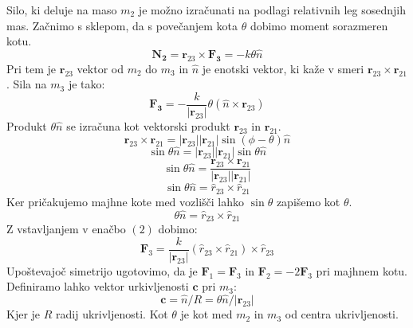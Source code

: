 \documentclass[10pt,a4paper]{article}
\begin{document}
Silo, ki deluje na maso $m_2$ je možno izračunati na podlagi relativnih leg sosednjih mas. Začnimo s sklepom, da s povečanjem kota $\theta$ dobimo moment sorazmeren kotu.
\begin{equation}
\mathbf{N_2} = \mathbf{r}_{23} \times \mathbf{F_3} = -k \theta \hat{n}
\end{equation}
Pri tem je $\mathbf{r}_{23}$ vektor od $m_2$ do $m_3$ in $\hat{n}$ je enotski vektor, ki kaže v smeri $\mathbf{r}_{23} \times \mathbf{r}_{21}$. Sila na $m_3$ je tako:
\begin{equation}
\mathbf{F_3} = -\frac{k}{|\mathbf{r}_{23}|}\theta(\hat{n} \times \mathbf{r}_{23})
\end{equation}
Produkt $\theta \hat{n}$ se izračuna kot vektorski produkt $\mathbf{r}_{23}$ in $\mathbf{r}_{21}$.
\begin{equation}
\mathbf{r}_{23} \times \mathbf{r}_{21} = |\mathbf{r}_{23}||\mathbf{r}_{21}| \sin(\phi - \theta) \hat{n}
\end{equation}
\begin{equation}
\sin\theta\hat{n} = |\mathbf{r}_{23}||\mathbf{r}_{21}|\sin\theta\hat{n}
\end{equation}
\begin{equation}
\sin\theta\hat{n} = \frac{\mathbf{r}_{23} \times \mathbf{r}_{21}}{|\mathbf{r}_{23}||\mathbf{r}_{21}|}
\end{equation}
\begin{equation} \label{eq:1}
\sin\theta\hat{n} = \hat{r}_{23} \times \hat{r}_{21}
\end{equation}
Ker pričakujemo majhne kote med vozlišči lahko $\sin\theta$ zapišemo kot $\theta$.
\begin{equation} \label{eq:2}
\theta\hat{n} = \hat{r}_{23} \times \hat{r}_{21}
\end{equation}
Z vstavljanjem v enačbo $(2)$ dobimo:
\begin{equation}
\mathbf{F}_3 = \frac{k}{|\mathbf{r}_{23}|}(\hat{r}_{23} \times \hat{r}_{21}) \times \hat{r}_{23}
\end{equation}
Upoštevajoč simetrijo ugotovimo, da je $\mathbf{F}_1 = \mathbf{F}_3$ in $\mathbf{F}_2 = -2\mathbf{F}_3$ pri majhnem kotu. Definiramo lahko vektor urkivljenosti $\mathbf{c}$ pri $m_3$:
\begin{equation}
\mathbf{c} = \hat{n}/R = \theta \hat{n} / |\mathbf{r}_{23}|
\end{equation}
Kjer je $R$ radij ukrivljenosti. Kot $\theta$ je kot med $m_2$ in $m_3$ od centra ukrivljenosti.
\end{document}
